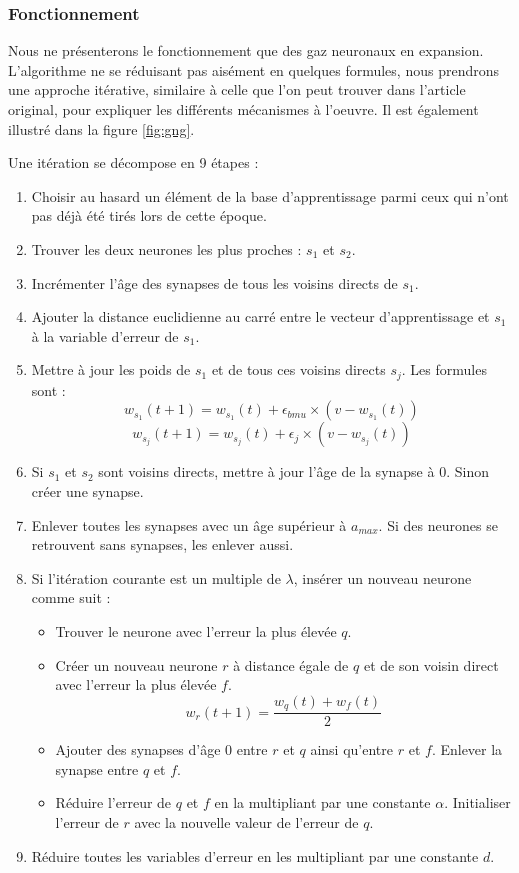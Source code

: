 	\subsubsection{Fonctionnement}

	Nous ne présenterons le fonctionnement que des gaz neuronaux en expansion. L'algorithme ne se réduisant pas aisément en quelques formules, nous prendrons une approche itérative, similaire à celle que l'on peut trouver dans l'article original, pour expliquer les différents mécanismes à l'oeuvre. Il est également illustré dans la figure \ref{fig:gng}.

	Une itération se décompose en 9 étapes :
	\begin{enumerate}
		\item Choisir au hasard un élément de la base d'apprentissage parmi ceux qui n'ont pas déjà été tirés lors de cette époque.
		\item Trouver les deux neurones les plus proches : $s_1$ et $s_2$.
		\item Incrémenter l'âge des synapses de tous les voisins directs de $s_1$.
		\item Ajouter la distance euclidienne au carré entre le vecteur d'apprentissage et $s_1$ à la variable d'erreur de $s_1$.
		\item Mettre à jour les poids de $s_1$ et de tous ces voisins directs $s_j$. Les formules sont :
		\begin{equation}
			w_{s_1}(t+1) = w_{s_1}(t) + \epsilon_{\textit{bmu}} \times (v - w_{s_1}(t))
		\end{equation}
		\begin{equation}
			w_{s_j}(t+1) = w_{s_j}(t) + \epsilon_{j} \times (v - w_{s_j}(t))
		\end{equation}
		\item Si $s_1$ et $s_2$ sont voisins directs, mettre à jour l'âge de la synapse à 0. Sinon créer une synapse.
		\item Enlever toutes les synapses avec un âge supérieur à $a_{\textit{max}}$. Si des neurones se retrouvent sans synapses, les enlever aussi.
		\item Si l'itération courante est un multiple de $\lambda$, insérer un nouveau neurone comme suit :
		\begin{itemize}
			\item Trouver le neurone avec l'erreur la plus élevée $q$.
			\item Créer un nouveau neurone $r$ à distance égale de $q$ et de son voisin direct avec l'erreur la plus élevée $f$.
			\begin{equation}
				w_r(t+1) = \frac{w_q(t) + w_f(t)}{2}  
			\end{equation}
			\item Ajouter des synapses d'âge 0 entre $r$ et $q$ ainsi qu'entre $r$ et $f$. Enlever la synapse entre $q$ et $f$.
			\item Réduire l'erreur de $q$ et $f$ en la multipliant par une constante $\alpha$. Initialiser l'erreur de $r$ avec la nouvelle valeur de l'erreur de $q$.
		\end{itemize}
		\item Réduire toutes les variables d'erreur en les multipliant par une constante $d$.
	\end{enumerate}

